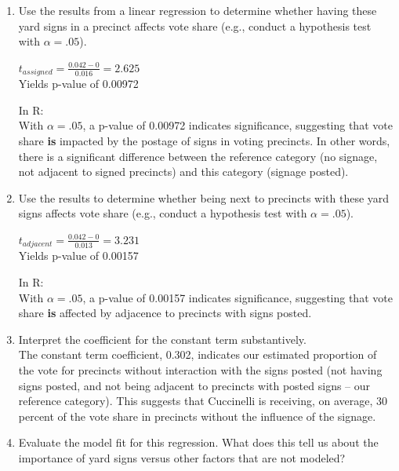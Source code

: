 \documentclass[12pt,letterpaper]{article}
\begin{document}
\vspace{.5cm}
\begin{enumerate}
	\item [(a)] Use the results from a linear regression to determine whether having these yard signs in a precinct affects vote share (e.g., conduct a hypothesis test with $\alpha = .05$).\\
	\vspace{.05cm}
		\begin{center}
			\(t_{assigned} = \frac{0.042 - 0}{0.016} = 2.625\) \\
			Yields p-value of 0.00972\\
		\vspace{.05cm}
		\end{center}
	\newpage
	In R:\\
			 
	\vspace{.03cm}		
	With $\alpha = .05$, a p-value of 0.00972 indicates significance, suggesting that vote share \textbf{is} impacted by the postage of signs in voting precincts. In other words, there is a significant difference between the reference category (no signage, not adjacent to signed precincts) and this category (signage posted). \\
	
	\item [(b)]  Use the results to determine whether being
	next to precincts with these yard signs affects vote
	share (e.g., conduct a hypothesis test with $\alpha = .05$).
	\vspace{.05cm}
		\begin{center}
			\(t_{adjacent} = \frac{0.042 - 0}{0.013} = 3.231\) \\
			Yields p-value of 0.00157\\
		\vspace{.05cm}
		\end{center}
	In R:\\
	 
	\vspace{.03cm}		
	With $\alpha = .05$, a p-value of 0.00157 indicates significance, suggesting that vote share \textbf{is} affected by adjacence to precincts with signs posted.\\
	\item [(c)] Interpret the coefficient for the constant term substantively.\\
	
	\vspace{.05cm}
		The constant term coefficient, 0.302, indicates our estimated proportion of the vote for precincts without interaction with the signs posted (not having signs posted, and not being adjacent to precincts with posted signs -- our reference category). This suggests that Cuccinelli is receiving, on average, 30 percent of the vote share in precincts without the influence of the signage.\\
	\vspace{.05cm}
	\item [(d)] Evaluate the model fit for this regression.  What does this	tell us about the importance of yard signs versus other factors that are not modeled?
	

\end{enumerate}
\end{document}
